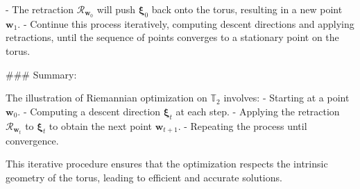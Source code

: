 - The retraction \(\mathcal{R}_{\mathbf{w}_0}\) will push \(\boldsymbol{\xi}_0\) back onto the torus, resulting in a new point \(\mathbf{w}_1\).
- Continue this process iteratively, computing descent directions and applying retractions, until the sequence of points converges to a stationary point on the torus.

### Summary:

The illustration of Riemannian optimization on \(\mathbb{T}_2\) involves:
- Starting at a point \(\mathbf{w}_0\).
- Computing a descent direction \(\boldsymbol{\xi}_t\) at each step.
- Applying the retraction \(\mathcal{R}_{\mathbf{w}_t}\) to \(\boldsymbol{\xi}_t\) to obtain the next point \(\mathbf{w}_{t+1}\).
- Repeating the process until convergence.

This iterative procedure ensures that the optimization respects the intrinsic geometry of the torus, leading to efficient and accurate solutions.